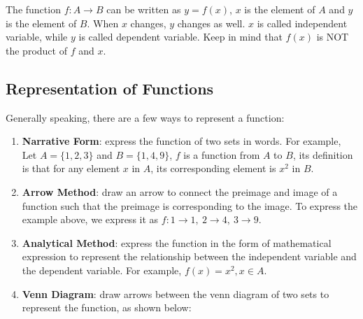 \documentclass[12pt]{report}
\begin{document}
The function $f: A \to B$ can be written as $y = f (x)$, $x$ is the element of
$A$ and $y$ is the element of $B$. When $x$ changes, $y$ changes as well. $x$
is called independent variable, while $y$ is called dependent variable. Keep in
mind that $f (x)$ is NOT the product of $f$ and $x$.

\newpage

\subsection*{Representation of Functions}

Generally speaking, there are a few ways to represent a function:
\begin{enumerate}
  \item \textbf{Narrative Form}: express the function of two sets in words. For example, Let $A = \big\{1, 2, 3\big\}$ and $B = \big\{1, 4, 9\big\}$, $f$ is a function from $A$ to $B$, its definition is that for any element $x$ in $A$, its corresponding element is $x^2$ in $B$.
  \item \textbf{Arrow Method}: draw an arrow to connect the preimage and image of a function such that the preimage is corresponding to the image. To express the example above, we express it as $f: 1 \to 1,\ 2 \to 4,\ 3 \to 9$.
  \item \textbf{Analytical Method}: express the function in the form of mathematical expression to represent the relationship between the independent variable and the dependent variable. For example, $f (x) = x^2, x \in A$.
  \item \textbf{Venn Diagram}: draw arrows between the venn diagram of two sets to represent the function, as shown below:
        \begin{center}
\end{center}
\end{enumerate}
\end{document}
